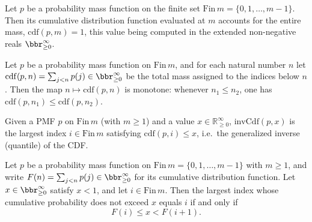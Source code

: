 \begin{lemma}
\label{CommunicationComplexity.Internal.cdf_one}
\leanok
{}
Let $p$ be a probability mass function on the finite set $\mathrm{Fin}\,m = \{0, 1,
\dots, m-1\}$. Then its cumulative distribution function evaluated at $m$ accounts for
the entire mass, $\mathrm{cdf}(p, m) = 1$, this value being computed in the extended
non-negative reals $\bbr_{\ge 0}^\infty$.
\end{lemma}

\begin{lemma}
\label{CommunicationComplexity.Internal.cdf_mono}
\leanok
{}
Let $p$ be a probability mass function on $\mathrm{Fin}\,m$, and for each natural number
$n$ let $\mathrm{cdf}(p, n) = \sum_{j < n} p(j) \in \bbr_{\ge 0}^\infty$ be the total
mass assigned to the indices below $n$. Then the map $n \mapsto \mathrm{cdf}(p, n)$ is
monotone: whenever $n_1 \le n_2$, one has $\mathrm{cdf}(p, n_1) \le \mathrm{cdf}(p,
n_2)$.
\end{lemma}

\begin{definition}
\label{CommunicationComplexity.Internal.invCdf}
\leanok
{}
Given a PMF $p$ on $\mathrm{Fin}\,m$ (with $m \ge 1$) and a value $x \in \mathbb{R}_{\ge 0}^\infty$,
$\mathrm{invCdf}(p, x)$ is the largest index $i \in \mathrm{Fin}\,m$ satisfying
$\mathrm{cdf}(p, i) \le x$, i.e.\ the generalized inverse (quantile) of the CDF.
\end{definition}

\begin{theorem}
\label{CommunicationComplexity.Internal.invCdf_eq_iff}
\leanok
{}
Let $p$ be a probability mass function on $\mathrm{Fin}\,m = \{0, 1, \dots, m-1\}$ with
$m \ge 1$, and write $F(n) = \sum_{j < n} p(j) \in \bbr_{\ge 0}^{\infty}$ for its
cumulative distribution function. Let $x \in \bbr_{\ge 0}^{\infty}$ satisfy $x < 1$, and
let $i \in \mathrm{Fin}\,m$. Then the largest index whose cumulative probability does
not exceed $x$ equals $i$ if and only if
\[
F(i) \le x < F(i+1).
\]
\end{theorem}

